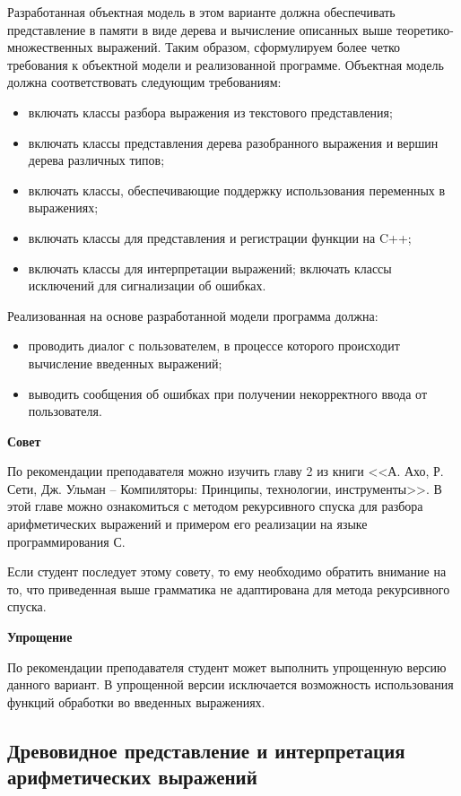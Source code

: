 \documentclass[a4paper,12pt]{article}
\begin{document}
Разработанная объектная модель в этом варианте должна обеспечивать
представление в памяти в виде дерева и вычисление описанных выше
теоретико-множественных выражений. Таким образом, сформулируем более
четко требования к объектной модели и реализованной программе.
Объектная модель должна соответствовать следующим требованиям:

\begin{itemize}
\item включать классы разбора выражения из текстового представления;
\item включать классы представления дерева разобранного выражения и
  вершин дерева различных типов;
\item включать классы, обеспечивающие поддержку использования
  переменных в выражениях;
\item включать классы для представления и регистрации функции на C++;
\item включать классы для интерпретации выражений; включать классы
  исключений для сигнализации об ошибках.
\end{itemize}

Реализованная на основе разработанной модели программа должна: 

\begin{itemize}
\item проводить диалог с пользователем, в процессе которого происходит
  вычисление введенных выражений;
\item выводить сообщения об ошибках при получении некорректного ввода
  от пользователя.
\end{itemize}

\textbf{Совет}

По рекомендации преподавателя можно изучить главу 2 из книги <<А. Ахо,
Р. Сети, Дж. Ульман – Компиляторы: Принципы, технологии,
инструменты>>. В этой главе можно ознакомиться с методом рекурсивного
спуска для разбора арифметических выражений и примером его реализации
на языке программирования С.

Если студент последует этому совету, то ему необходимо обратить
внимание на то, что приведенная выше грамматика не адаптирована для
метода рекурсивного спуска.

\textbf{Упрощение}

По рекомендации преподавателя студент может выполнить упрощенную
версию данного вариант. В упрощенной версии исключается возможность
использования функций обработки во введенных выражениях.

\subsection{Древовидное представление и интерпретация арифметических
  выражений}
\end{document}
